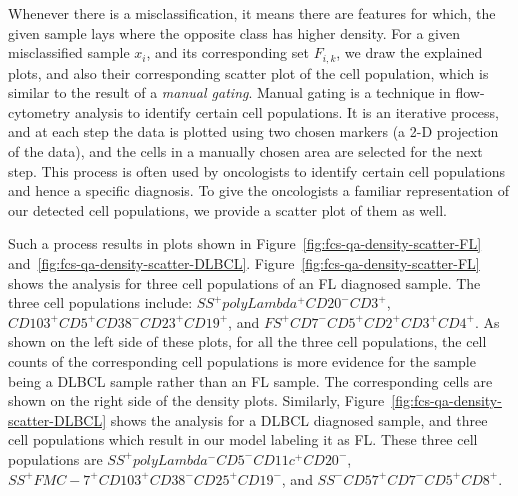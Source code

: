 Whenever there is a misclassification, it means there are features for which, the given sample lays where the opposite class has higher density. For a given misclassified sample $x_i$, and its corresponding set $F_{i,k}$, we draw the explained plots, and also their corresponding scatter plot of the cell population, which is similar to the result of a \emph{manual gating}. Manual gating is a technique in flow-cytometry analysis to identify certain cell populations. It is an iterative process, and at each step the data is plotted using two chosen markers (a 2-D projection of the data), and the cells in a manually chosen area are selected for the next step. This process is often used by oncologists to identify certain cell populations and hence a specific diagnosis. To give the oncologists a familiar representation of our detected cell populations, we provide a scatter plot of them as well.

Such a process results in plots shown in Figure~\ref{fig:fcs-qa-density-scatter-FL} and~\ref{fig:fcs-qa-density-scatter-DLBCL}. Figure~\ref{fig:fcs-qa-density-scatter-FL} shows the analysis for three cell populations of an FL diagnosed sample. The three cell populations include: $SS^+polyLambda^+CD20^−CD3^+$, $CD103^+CD5^+CD38^−CD23^+CD19^+$, and $FS^+CD7^−CD5^+CD2^+CD3^+CD4^+$. As shown on the left side of these plots, for all the three cell populations, the cell counts of the corresponding cell populations is more evidence for the sample being a DLBCL sample rather than an FL sample. The corresponding cells are shown on the right side of the density plots. Similarly, Figure~\ref{fig:fcs-qa-density-scatter-DLBCL} shows the analysis for a DLBCL diagnosed sample, and three cell populations which result in our model labeling it as FL. These three cell populations are $SS^+polyLambda^−CD5^−CD11c^+CD20^−$, $SS^+FMC−7^+CD103^+CD38^−CD25^+CD19^−$, and $SS^−CD57^+CD7^−CD5^+CD8^+$.

